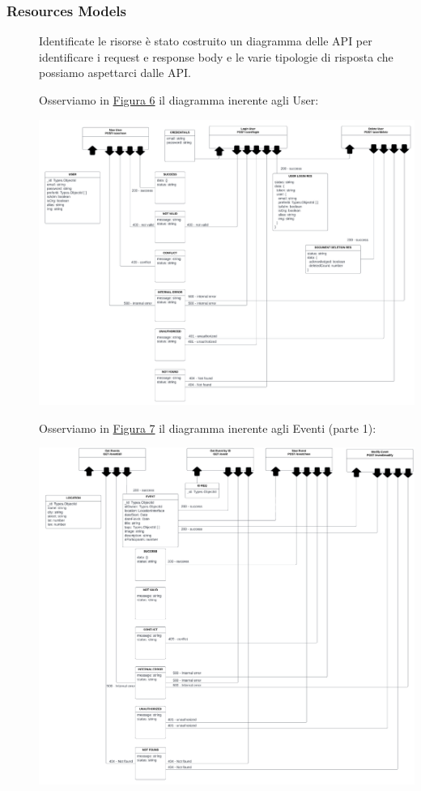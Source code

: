 \documentclass{article}
\begin{document}
\subsubsection{Resources Models}
\begin{description}
    \item[] Identificate le risorse è stato costruito un diagramma delle API per identificare i request e response body e le varie tipologie di risposta che possiamo aspettarci dalle API.
        \clearpage
    \item[] Osserviamo in \hyperref[img:6]{Figura 6} il diagramma inerente agli User:
    \item[] \label{img:6} \begin{center}
            \includegraphics[scale=0.9]{userResources.png}
        \end{center}
        \clearpage
    \item[] Osserviamo in \hyperref[img:7]{Figura 7} il diagramma inerente agli Eventi (parte 1):
    \item[] \label{img:7} \begin{center}
            \includegraphics[scale=0.9]{eventResources1.png}

\end{center}
\end{description}
\end{document}
